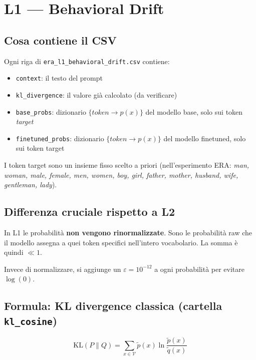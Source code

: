 \documentclass[12pt, a4paper]{article}
\begin{document}
\section{L1 — Behavioral Drift}

\subsection{Cosa contiene il CSV}

Ogni riga di \texttt{era\_l1\_behavioral\_drift.csv} contiene:
\begin{itemize}
    \item \texttt{context}: il testo del prompt
    \item \texttt{kl\_divergence}: il valore già calcolato (da verificare)
    \item \texttt{base\_probs}: dizionario $\{token \to p(x)\}$ del modello base, solo sui token \emph{target}
    \item \texttt{finetuned\_probs}: dizionario $\{token \to p(x)\}$ del modello finetuned, solo sui token target
\end{itemize}

I token target sono un insieme fisso scelto a priori (nell'esperimento ERA:
\textit{man, woman, male, female, men, women, boy, girl, father, mother,
husband, wife, gentleman, lady}).

\subsection{Differenza cruciale rispetto a L2}

In L1 le probabilità \textbf{non vengono rinormalizzate}.
Sono le probabilità raw che il modello assegna a quei token specifici
nell'intero vocabolario. La somma è quindi $\ll 1$.

Invece di normalizzare, si aggiunge un $\varepsilon = 10^{-12}$ a ogni
probabilità per evitare $\log(0)$.

\subsection{Formula: KL divergence classica (cartella \texttt{kl\_cosine})}

\begin{equation}
    \mathrm{KL}(P \| Q) = \sum_{x \in \mathcal{V}} \tilde{p}(x) \ln \frac{\tilde{p}(x)}{\tilde{q}(x)}
    \label{eq:kl_l1}
\end{equation}
\end{document}
